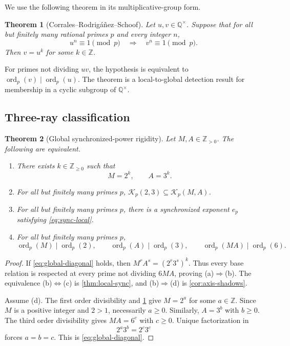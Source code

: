 \documentclass[11pt]{article}
\newtheorem{theorem}{Theorem}[section]
\theoremstyle{definition}
\newcommand{\Z}{\mathbb Z}
\newcommand{\Q}{\mathbb Q}
\newcommand{\ord}{\operatorname{ord}}
\newcommand{\Rel}{\mathcal K}
\begin{document}
We use the following theorem in its multiplicative-group form.

\begin{theorem}[Corrales--Rodrig\'a\~nez--Schoof]
\label{thm:CRS}
Let $u,v\in\Q^\times$.  Suppose that for all but finitely many rational primes $p$ and every
integer $n$,
\[
 u^n\equiv1\pmod p
 \quad\Longrightarrow\quad
 v^n\equiv1\pmod p.
\]
Then $v=u^k$ for some $k\in\Z$.
\end{theorem}

For primes not dividing $uv$, the hypothesis is equivalent to
$\ord_p(v)\mid\ord_p(u)$.  The theorem is a local-to-global detection result for membership in
a cyclic subgroup of $\Q^\times$.

\subsection{Three-ray classification}

\begin{theorem}[Global synchronized-power rigidity]
\label{thm:global-rigidity}
Let $M,A\in\Z_{>0}$.  The following are equivalent.
\begin{enumerate}[label=(\alph*)]
\item There exists $k\in\Z_{\ge0}$ such that
\begin{equation}
 M=2^k,
 \qquad A=3^k.
 \label{eq:global-diagonal}
\end{equation}
\item For all but finitely many primes $p$,
$\Rel_p(2,3)\subseteq\Rel_p(M,A)$.
\item For all but finitely many primes $p$, there is a synchronized exponent $e_p$ satisfying
\eqref{eq:sync-local}.
\item For all but finitely many primes $p$,
\begin{equation}
 \ord_p(M)\mid\ord_p(2),\qquad
 \ord_p(A)\mid\ord_p(3),\qquad
 \ord_p(MA)\mid\ord_p(6).
 \label{eq:three-support}
\end{equation}
\end{enumerate}
\end{theorem}

\begin{proof}
If \eqref{eq:global-diagonal} holds, then
$M^rA^s=(2^r3^s)^k$.  Thus every base relation is respected at every prime not dividing
$6MA$, proving (a)$\Rightarrow$(b).  The equivalence (b)$\Leftrightarrow$(c) is
\cref{thm:local-sync}, and (b)$\Rightarrow$(d) is \cref{cor:axis-shadows}.

Assume (d).  The first order divisibility and \cref{thm:CRS} give $M=2^a$ for some
$a\in\Z$.  Since $M$ is a positive integer and $2>1$, necessarily $a\ge0$.  Similarly,
$A=3^b$ with $b\ge0$.  The third order divisibility gives $MA=6^c$ with $c\ge0$.  Unique
factorization in
\[
 2^a3^b=2^c3^c
\]
forces $a=b=c$.  This is \eqref{eq:global-diagonal}.
\end{proof}
\end{document}
